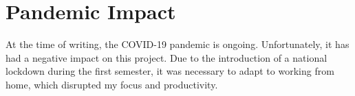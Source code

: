 \documentclass[../../report.tex]{subfiles}
\begin{document}
\section{Pandemic Impact}

At the time of writing, the COVID-19 pandemic is ongoing. Unfortunately, it has
had a negative impact on this project. Due to the introduction of a national
lockdown during the first semester, it was necessary to adapt to working from
home, which disrupted my focus and productivity.
\end{document}
